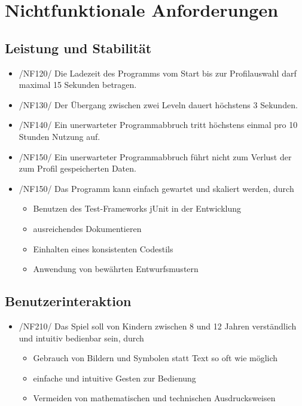 \section{Nichtfunktionale Anforderungen}

\subsection{Leistung und Stabilität}

\begin{itemize}
\item /NF120/ Die Ladezeit des Programms vom Start bis zur Profilauswahl darf maximal 15 Sekunden betragen.
\item /NF130/ Der \"Ubergang zwischen zwei Leveln dauert höchstens 3 Sekunden.
\item /NF140/ Ein unerwarteter Programmabbruch tritt höchstens einmal pro 10 Stunden Nutzung auf.
\item /NF150/ Ein unerwarteter Programmabbruch führt nicht zum Verlust der zum Profil gespeicherten Daten.
\item /NF150/ Das Programm kann einfach gewartet und skaliert werden, durch
\begin{itemize}
\item Benutzen des Test-Frameworks jUnit in der Entwicklung
\item ausreichendes Dokumentieren
\item Einhalten eines konsistenten Codestils
\item Anwendung von bewährten Entwurfsmustern
\end{itemize}
\end{itemize}

\subsection{Benutzerinteraktion}
\begin{itemize}
\item /NF210/ Das Spiel soll von Kindern zwischen 8 und 12 Jahren verständlich und intuitiv bedienbar sein, durch
\begin{itemize}
\item Gebrauch von Bildern und Symbolen statt Text so oft wie möglich
\item einfache und intuitive Gesten zur Bedienung
\item Vermeiden von mathematischen und technischen Ausdrucksweisen
\end{itemize}
\end{itemize}

